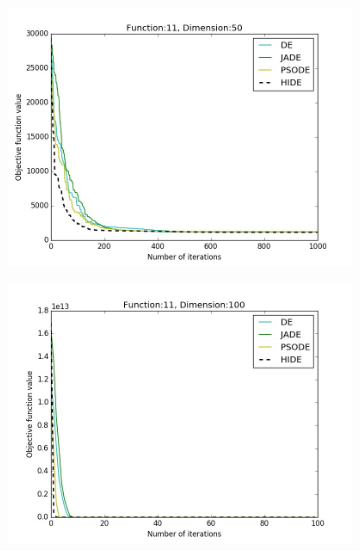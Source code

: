 \documentclass[a4paper,twoside]{article}
\begin{document}
\begin{figure}[h!]
\begin{subfigure}[b]{0.24\textwidth}
        \includegraphics[width=\textwidth,natwidth=800,natheight=600]{plot_50D_F11_save}
        \caption{}
    \end{subfigure}
    \begin{subfigure}[b]{0.24\textwidth}
        \includegraphics[width=\textwidth,natwidth=800,natheight=600]{plot_100D_F11_save}
        \caption{}
    \end{subfigure}


\end{figure}
\end{document}
